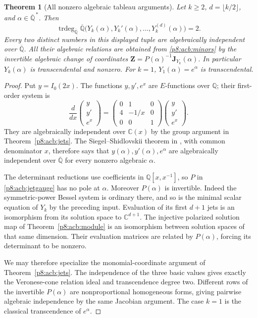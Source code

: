 \documentclass[11pt,a4paper]{article}
\newtheorem{theorem}{Theorem}[section]
\theoremstyle{definition}
\theoremstyle{remark}
\numberwithin{equation}{section}
\begin{document}
\begin{theorem}[All nonzero algebraic tableau arguments]
\label{p8:acb:values}
Let $k\ge2$, $d=\lfloor k/2\rfloor$, and
$\alpha\in\overline{\mathbb Q}^{\,*}$.
Then
\[
 \operatorname{trdeg}_{\overline{\mathbb Q}}
 \overline{\mathbb Q}\bigl(Y_k(\alpha),Y_k'(\alpha),\ldots,
                                Y_k^{(d)}(\alpha)\bigr)=2.
\]
Every two distinct numbers in this displayed tuple are
algebraically independent over $\overline{\mathbb Q}$.
All their algebraic relations are obtained from
\eqref{p8:acb:minors} by the invertible algebraic change of
coordinates $\mathbf Z=P(\alpha)^{-1}\mathbf J_{Y_k}(\alpha)$.
In particular $Y_k(\alpha)$ is transcendental and nonzero.
For $k=1$, $Y_1(\alpha)=e^\alpha$ is transcendental.
\end{theorem}

\begin{proof}
Put $y=I_0(2x)$.  The functions $y,y',e^x$ are $E$-functions
over $\mathbb Q$; their first-order system is
\[
 \frac{d}{dx}
 \begin{pmatrix}y\\y'\\e^x\end{pmatrix}
 =\begin{pmatrix}0&1&0\\4&-1/x&0\\0&0&1\end{pmatrix}
 \begin{pmatrix}y\\y'\\e^x\end{pmatrix}.
\]
They are algebraically independent over $\mathbb C(x)$ by
the group argument in Theorem~\ref{p8:acb:jets}.
The Siegel--Shidlovskii theorem in
\cite[Theorem~1.1]{p8:AC_Beukers2006}, with common denominator $x$,
therefore says that $y(\alpha),y'(\alpha),e^\alpha$ are
algebraically independent over $\overline{\mathbb Q}$ for every
nonzero algebraic $\alpha$.

The determinant reductions use coefficients in
$\mathbb Q[x,x^{-1}]$, so $P$ in \eqref{p8:acb:jetgauge} has no
pole at $\alpha$.  Moreover $P(\alpha)$ is invertible.
Indeed the symmetric-power Bessel system is ordinary there,
and so is the minimal scalar equation of $Y_k$ by the preceding
input.  Evaluation of its first $d+1$ jets is an isomorphism
from its solution space to $\mathbb C^{d+1}$.  The injective
polarized solution map of Theorem~\ref{p8:acb:module} is an
isomorphism between solution spaces of that same dimension.
Their evaluation matrices are related by $P(\alpha)$, forcing
its determinant to be nonzero.

We may therefore specialize the monomial-coordinate argument
of Theorem~\ref{p8:acb:jets}.  The independence of the three basic
values gives exactly the Veronese-cone relation ideal and
transcendence degree two.  Different rows of the invertible
$P(\alpha)$ are nonproportional homogeneous forms, giving
pairwise algebraic independence by the same Jacobian argument.
The case $k=1$ is the classical transcendence of $e^\alpha$.
\end{proof}
\end{document}

